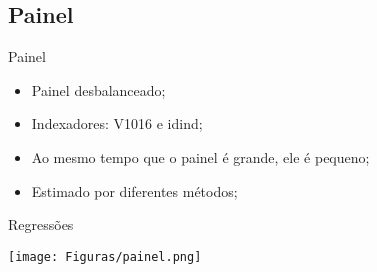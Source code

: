 \documentclass[xcolor={dvipsnames}]{beamer}
\begin{document}
\subsection{Painel}
\begin{frame}{Painel}
\begin{itemize}
    \item Painel desbalanceado;
    \item Indexadores: V1016 e idind;
    \item Ao mesmo tempo que o painel é grande, ele é pequeno;
    \item Estimado por diferentes métodos;
    
\end{itemize}
\end{frame}

\begin{frame}{Regressões}
\begin{center}
    \texttt{[image: Figuras/painel.png]}
\end{center}
\end{frame}
\end{document}
